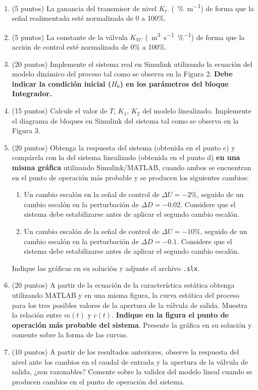 \begin{enumerate}[label=\alph*), start=2]
    \item (5 puntos) La ganancia del transmisor de nivel $K_t$. (\SI{}{\%\metre\tothe{-1}}) de forma que la señal
realimentada esté normalizada de 0 a 100\%.
    \item (5 puntos) La constante de la válvula $K _{VC}$ (\SI{}{\metre\cubed\second\tothe{-1}\%\tothe{-1}}) de forma que la acción de control esté normalizada de 0\% a 100\%.
    \item (20 puntos) Implemente el sistema real en Simulink utilizando la ecuación del modelo
        dinámico del proceso tal como se observa en la Figura 2. %
        \textbf{Debe indicar la condición inicial ($H_0$) en los parámetros del bloque Integrador.}
    \item (15 puntos) Calcule el valor de $T$, $K_1$, $K_2$ del modelo linealizado. Implemente el diagrama de bloques en Simulink del sistema tal como se observa en la Figura 3.
    \item (20 puntos) Obtenga la respuesta del sistema (obtenida en el punto c) y compárela con la del sistema linealizado (obtenida en el punto d) \textbf{en una misma gráfica} utilizando Simulink/MATLAB, cuando ambos se encuentran en el punto de operación más probable y se producen los siguientes cambios:
        \begin{enumerate}[label=\roman*.]
            \item Un cambio escalón en la señal de control de $\Delta U = -2\%$, seguido de un cambio escalón en la perturbación de $\Delta D = -0.02$.
                Considere que el sistema debe estabilizarse antes de aplicar el segundo cambio escalón.
            \item Un cambio escalón de la señal de control de $\Delta U = -10\%$, seguido de un cambio escalón en la perturbación de $\Delta D = -0.1$. Considere que el sistema debe estabilizarse antes de aplicar el segundo cambio escalón.
        \end{enumerate}
        Indique las gráficas en su solución y adjunte el archivo \texttt{.slx}.
    \item (20 puntos) A partir de la ecuación de la característica estática obtenga utilizando MATLAB
y en una misma figura, la curva estática del proceso para los tres posibles valores de la
apertura de la válvula de salida. Muestra la relación entre $m(t)$ y $c(t)$. 
\textbf{Indique en la figura el punto de operación más probable del sistema}. Presente la gráfica en su solución y comente sobre la forma de las curvas.
    \item (10 puntos) A partir de los resultados anteriores, observe la respuesta del nivel ante los
cambios en el caudal de entrada y la apertura de la válvula de salida, ¿son razonables?
Comente sobre la validez del modelo lineal cuando se producen cambios en el punto
de operación del sistema.
\end{enumerate}

